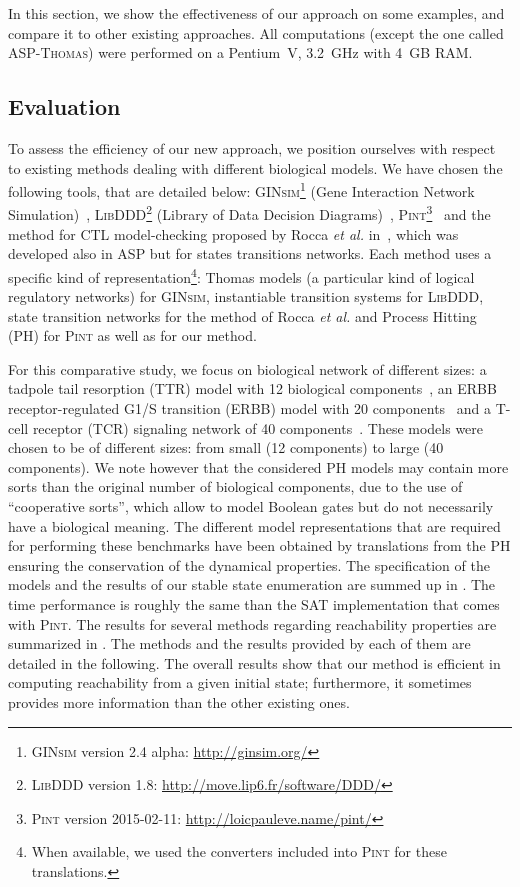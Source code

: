 In this section, we show the effectiveness of our approach on some examples,
and compare it to other existing approaches.
All computations (except the one called \textsc{ASP-Thomas}) were performed on a Pentium~V, 3.2~GHz with 4~GB RAM.

\subsection{Evaluation}
To assess the efficiency of our new approach,
we position ourselves with respect to existing methods dealing with different biological models.
We have chosen the following tools, that are detailed below: 
\textsc{GINsim}\footnote{\textsc{GINsim} version 2.4 alpha: \url{http://ginsim.org/}} (Gene Interaction Network Simulation)~\cite{gonzalez2006ginsim,naldi2009logical,naldi2007decision},
\textsc{LibDDD}\footnote{\textsc{LibDDD} version 1.8: \url{http://move.lip6.fr/software/DDD/}}
(Library of Data Decision Diagrams)~\cite{thierry2009hierarchical,colange2013towards},
\textsc{Pint}\footnote{\textsc{Pint} version 2015-02-11: \url{http://loicpauleve.name/pint/}}~\cite{PMR12-MSCS}
and the method for CTL model-checking proposed by Rocca \textit{et al.} in~\cite{roccaasp},
which was developed also in ASP but for states transitions networks.
Each method uses a specific kind of representation\footnote{When available, we used the converters included into \textsc{Pint} for these translations.}:
Thomas models (a particular kind of logical regulatory networks) for \textsc{GINsim},
instantiable transition systems for \textsc{LibDDD},
state transition networks for the method of Rocca \textit{et al.}
and Process Hitting (PH) for \textsc{Pint} as well as for our method.

For this comparative study, we focus on biological network of different sizes:
a tadpole tail resorption (TTR) model with 12 biological components~\cite{khalis2009smbionet},
an ERBB receptor-regulated G1/S transition (ERBB) model with 20 components~\cite{Samaga2009}
and a T-cell receptor (TCR) signaling network of 40 components~\cite{Klamt06}.
These models were chosen to be of different sizes:
from small (12 components) to large (40 components).
We note however that the considered PH models may contain more sorts than
the original number of biological components, due to the use of
``cooperative sorts'', which allow to model Boolean gates but do not necessarily
have a biological meaning.
The different model representations that are required for performing these benchmarks have been obtained by translations
from the PH
ensuring the conservation of the dynamical properties.
The specification of the models and the results of our stable state enumeration
are summed up in .
The time performance is roughly the same than the SAT implementation
that comes with \textsc{Pint}.
The results for several methods regarding reachability properties
are summarized in .
The methods and the results provided by each of them are detailed in the following.
The overall results show that our method is efficient in computing reachability
from a given initial state;
furthermore, it sometimes provides more information than the other existing ones.

